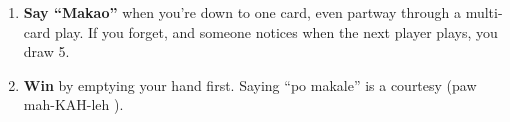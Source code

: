 {\begin{enumerate}[leftmargin=1.5em,itemsep=0.5\baselineskip,topsep=0pt,parsep=0pt]
      \begin{itemize}[leftmargin=0pt,label={},itemsep=0pt,topsep=0.2\baselineskip,parsep=0pt]
        \item \textbf{2 / 3:} e.g.\ 2\Heart{} on 3\Heart: next player draws 5 (or deflects further)
        \item \textbf{K\Heart:} blocked by K\Diamondsuit{} / K\Club{}; deflected by 2\Heart, 3\Heart{} or K\Spade{}
        \item \textbf{J:} deflected only before a demanded card has been played
      \end{itemize}
    \item
      \textbf{Say ``Makao''} when you're down to one card, even partway through a multi-card play.
      If you forget, and someone notices when the next player plays, you draw 5.
    \item
      \textbf{Win} by emptying your hand first.
      Saying ``po makale'' is a courtesy (paw mah-KAH-leh ).
  \end{enumerate}

  \cardfooter{\footurlB}
}

\newcommand{\cell}[1]{%
  \vbox to \cellh{\vss\hbox to \cellw{\hss
    \parbox[c][\dimexpr\cellh-2\inset\relax][t]{\dimexpr\cellw-2\inset\relax}{\bodysize #1}%
  \hss}\vss}}
\newcommand{\cellrow}[1]{\hbox to \paperwidth{\cell{#1}\cell{#1}}}

\newcommand{\fourup}[1]{%
  \noindent\vbox to \paperheight{\offinterlineskip\cellrow{#1}\cellrow{#1}}}

\newcommand{\cutlines}{%
  \begin{tikzpicture}[remember picture,overlay]
    \draw[gray!60,dash pattern=on 3pt off 3pt,thin]
      (current page.north) -- (current page.south);
    \draw[gray!60,dash pattern=on 3pt off 3pt,thin]
      (current page.west) -- (current page.east);
  \end{tikzpicture}}

\newcommand{\oneup}[1]{%
  \noindent\vbox to \paperheight{\offinterlineskip\scalebox{2}{\cell{#1}}\vss}}

\ifdefined\oneupmode
  \newcommand{\cardrules}{%
    \oneup{\sideA}
    \newpage
    \oneup{\sideB}
  }
\else
  \newcommand{\cardrules}{%
    \fourup{\sideA}\cutlines
    \newpage
    \fourup{\sideB}
  }
\fi
